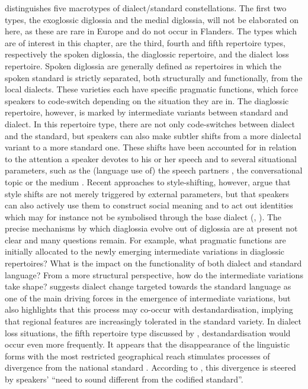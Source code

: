 \documentclass[output=paper]{LSP/langsci}
\begin{document}
\citet{auer_europes_2005,auer_dialect_2011} distinguishes five macrotypes of dialect/standard constellations. The first two types, the exoglossic diglossia and the medial diglossia, will not be elaborated on here, as these are rare in Europe and do not occur in Flanders. The types which are of interest in this chapter, are the third, fourth and fifth repertoire types, respectively the spoken diglossia, the diaglossic repertoire, and the dialect loss repertoire. Spoken diglossia are generally defined as repertoires in which the spoken standard is strictly separated, both structurally and functionally, from the local dialects. These varieties each have specific pragmatic functions, which force speakers to code-switch depending on the situation they are in. The diaglossic repertoire, however, is marked by intermediate variants between standard and dialect. In this repertoire type, there are not only code-switches between dialect and the standard, but speakers can also make subtler shifts from a more dialectal variant to a more standard one. These shifts have been accounted for in relation to the attention a speaker devotes to his or her speech \citep[208]{labov_sociolinguistic_1972} and to several situational parameters, such as the (language use of) the speech partners \citep{bell_language_1984}, the conversational topic or the medium \citep{giles_speech_1975}. Recent approaches to style-shifting, however, argue that style shifts are not merely triggered by external parameters, but that speakers can also actively use them to construct social meaning and to act out identities which may for instance not be symbolised through the base dialect (\citealt[23]{auer_europes_2005}, \citealt[378]{schilling-estes_investigating_2002}). The precise mechanisms by which diaglossia evolve out of diglossia are at present not clear and many questions remain. For example, what pragmatic functions are initially allocated to the newly emerging intermediate variations in diaglossic repertoires? What is the impact on the functionality of both dialect and standard language? From a more structural perspective, how do the intermediate variations take shape? \citet[25]{auer_europes_2005} suggests dialect change targeted towards the standard language as one of the main driving forces in the emergence of intermediate variations, but also highlights that this process may co-occur with destandardisation, implying that regional features are increasingly tolerated in the standard variety. In dialect loss situations, the fifth repertoire type discussed by \citet{auer_europes_2005,auer_dialect_2011}, destandardisation would occur even more frequently. It appears that the disappearance of the linguistic forms with the most restricted geographical reach stimulates processes of divergence from the national standard \citep[30]{auer_europes_2005}. According to \citet[30]{auer_europes_2005}, this divergence is steered by speakers’ “need to sound different from the codified standard”. 
\end{document}
